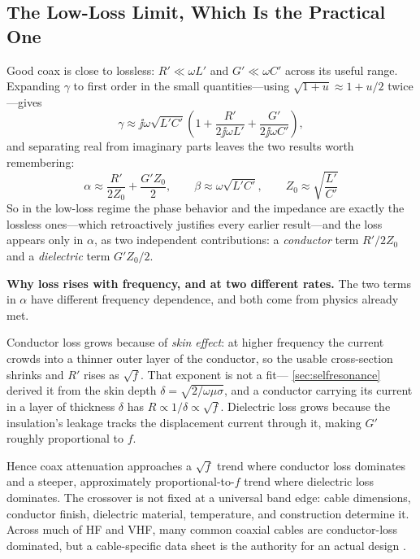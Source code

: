 \subsection{The Low-Loss Limit, Which Is the Practical One}
Good coax is close to lossless: \(R'\ll\omega L'\) and \(G'\ll\omega C'\) across its
useful range. Expanding \(\gamma\) to first order in the small quantities---using
\(\sqrt{1+u}\approx1+u/2\) twice---gives
\[
\gamma\approx\jj\omega\sqrt{L'C'}
\left(1+\frac{R'}{2\jj\omega L'}+\frac{G'}{2\jj\omega C'}\right),
\]
and separating real from imaginary parts leaves the two results worth remembering:
\[
\boxed{\;
\alpha\approx\frac{R'}{2Z_0}+\frac{G'Z_0}{2},
\qquad
\beta\approx\omega\sqrt{L'C'},
\qquad
Z_0\approx\sqrt{\frac{L'}{C'}} \;}
\]
So in the low-loss regime the phase behavior and the impedance are exactly the
lossless ones---which retroactively justifies every earlier result---and the loss
appears only in \(\alpha\), as two independent contributions: a \emph{conductor}
term \(R'/2Z_0\) and a \emph{dielectric} term \(G'Z_0/2\).

\begin{physicalbox}
\textbf{Why loss rises with frequency, and at two different rates.} The two terms in
\(\alpha\) have different frequency dependence, and both come from physics already
met.

Conductor loss grows because of \emph{skin effect}: at higher frequency the current
crowds into a thinner outer layer of the conductor, so the usable cross-section
shrinks and \(R'\) rises as \(\sqrt f\). That exponent is not a fit---
\cref{sec:selfresonance} derived it from the skin depth
\(\delta=\sqrt{2/\omega\mu\sigma}\), and a conductor carrying its current in a layer
of thickness \(\delta\) has \(R\propto1/\delta\propto\sqrt f\). Dielectric loss grows because the
insulation's leakage tracks the displacement current through it, making \(G'\)
roughly proportional to \(f\).

Hence coax attenuation approaches a \(\sqrt f\) trend where conductor loss dominates
and a steeper, approximately proportional-to-\(f\) trend where dielectric loss
dominates. The crossover is not fixed at a universal band edge: cable dimensions,
conductor finish, dielectric material, temperature, and construction determine it.
Across much of HF and VHF, many common coaxial cables are conductor-loss dominated,
but a cable-specific data sheet is the authority for an actual design
\cite[pp.~51--53, 78--96]{white2004highfrequency}.
\end{physicalbox}

